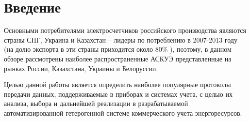 \newpage

\section*{Введение}

Основными  потребителями  электросчетчиков российского производства являются страны СНГ, Украина и Казахстан – лидеры по потреблению в 2007-2013 году (на долю экспорта в эти страны приходится около  80\% \cite{rbk} ),  поэтому,  в  данном  обзоре  рассмотрены  наиболее распространенные АСКУЭ представленные на рынках России, Казахстана, Украины и Белоруссии.


Целью данной работы является определить наиболее популярные протоколы передачи данных, поддерживаемые в приборах и системах учета, с целью их анализа, выбора и дальнейшей реализации в разрабатываемой автоматизированной гетерогенной системе коммерческого учета энергоресурсов.